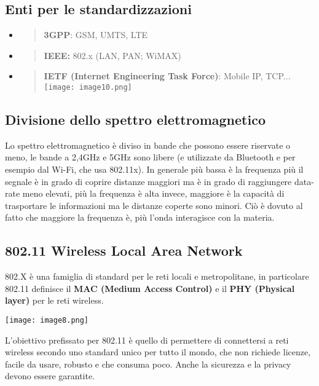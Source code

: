 \subsection{Enti per le
standardizzazioni}\label{enti-per-le-standardizzazioni}

\begin{itemize}
\item
  \begin{quote}
  \textbf{3GPP}: GSM, UMTS, LTE
  \end{quote}
\item
  \begin{quote}
  \textbf{IEEE:} 802.x (LAN, PAN; WiMAX)
  \end{quote}
\item
  \begin{quote}
  \textbf{IETF (Internet Engineering Task Force)}: Mobile IP,
  TCP...\texttt{[image: image10.png]}
  \end{quote}
\end{itemize}

\subsection{Divisione dello spettro elettromagnetico}
Lo spettro elettromagnetico è diviso in bande che possono essere riservate o 
meno, le bande a 2,4GHz e 5GHz sono libere (e utilizzate da Bluetooth e per 
esempio dal Wi-Fi, che usa 802.11x). In generale più bassa è la frequenza più il 
segnale è in grado di coprire distanze maggiori ma è in grado di raggiungere 
data-rate meno elevati, più la frequenza è alta invece, maggiore è la capacità 
di trasportare le informazioni ma le distanze coperte sono minori. Ciò è dovuto 
al fatto che maggiore la frequenza è, più l'onda interagisce con la materia.

\subsection{802.11 Wireless Local Area
Network}\label{wireless-local-area-network}

802.X è una famiglia di standard per le reti locali e metropolitane, in
particolare 802.11 definisce il \textbf{MAC (Medium Access Control)} e
il \textbf{PHY (Physical layer)} per le reti wireless.

\texttt{[image: image8.png]}

L'obiettivo prefissato per 802.11 è quello di permettere di connettersi
a reti wireless secondo uno standard unico per tutto il mondo, che non
richiede licenze, facile da usare, robusto e che consuma poco. Anche la sicurezza
e la privacy devono essere garantite.


